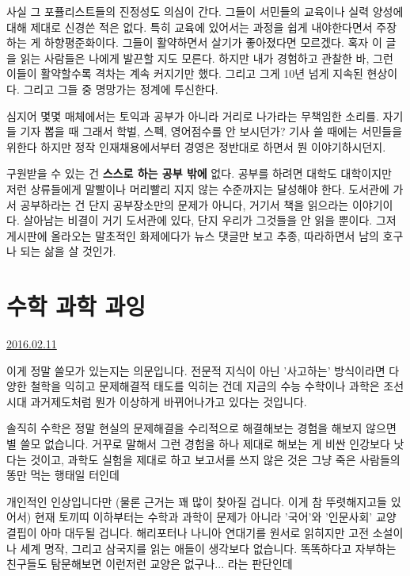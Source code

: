 사실 그 포퓰리스트들의 진정성도 의심이 간다.
그들이 서민들의 교육이나 실력 양성에 대해 제대로 신경쓴 적은 없다.
특히 교육에 있어서는 과정을 쉽게 내야한다면서 주장하는 게 하향평준화이다.
그들이 활약하면서 살기가 좋아졌다면 모르겠다.
혹자 이 글을 읽는 사람들은 나에게 발끈할 지도 모른다.
하지만 내가 경험하고 관찰한 바, 그런 이들이 활약할수록 격차는 계속 커지기만 했다.
그리고 그게 10년 넘게 지속된 현상이다.
그리고 그들 중 명망가는 정계에 투신한다.
\vspace{5mm}

심지어 몇몇 매체에서는 토익과 공부가 아니라 거리로 나가라는 무책임한 소리를.
자기들 기자 뽑을 때 그래서 학벌, 스펙, 영어점수를 안 보시던가?
기사 쓸 때에는 서민들을 위한다 하지만 정작 인재채용에서부터 경영은 정반대로 하면서 뭔 이야기하시던지.
\vspace{5mm}

구원받을 수 있는 건 \textbf{스스로 하는 공부 밖에} 없다.
공부를 하려면 대학도 대학이지만 저런 상류들에게 말빨이나 머리빨리 지지 않는 수준까지는 달성해야 한다.
도서관에 가서 공부하라는 건 단지 공부장소만의 문제가 아니다, 거기서 책을 읽으라는 이야기이다.
살아남는 비결이 거기 도서관에 있다, 단지 우리가 그것들을 안 읽을 뿐이다.
그저 게시판에 올라오는 말초적인 화제에다가 뉴스 댓글만 보고 추종, 따라하면서 남의 호구나 되는 삶을 살 것인가.
\vspace{5mm}






\section{수학 과학 과잉}
\href{https://www.kockoc.com/Apoc/631442}{2016.02.11}

\vspace{5mm}

이게 정말 쓸모가 있는지는 의문입니다.
전문적 지식이 아닌 '사고하는' 방식이라면 다양한 철학을 익히고 문제해결적 태도를 익히는 건데
지금의 수능 수학이나 과학은 조선시대 과거제도처럼 뭔가 이상하게 바뀌어나가고 있다는 것입니다.
\vspace{5mm}

솔직히 수학은 정말 현실의 문제해결을 수리적으로 해결해보는 경험을 해보지 않으면 별 쓸모 없습니다.
거꾸로 말해서 그런 경험을 하나 제대로 해보는 게 비싼 인강보다 낫다는 것이고,
과학도 실험을 제대로 하고 보고서를 쓰지 않은 것은 그냥 죽은 사람들의 똥만 먹는 행태일 터인데
\vspace{5mm}

개인적인 인상입니다만 (물론 근거는 꽤 많이 찾아질 겁니다. 이게 참 뚜렷해지고들 있어서)
현재 토끼띠 이하부터는 수학과 과학이 문제가 아니라 '국어'와 '인문사회' 교양 결핍이 아마 대두될 겁니다.
해리포터나 나니아 연대기를 원서로 읽히지만 고전 소설이나 세계 명작, 그리고 삼국지를 읽는 애들이 생각보다 없습니다.
똑똑하다고 자부하는 친구들도 탐문해보면 이런저런 교양은 없구나... 라는 판단인데
\vspace{5mm}


